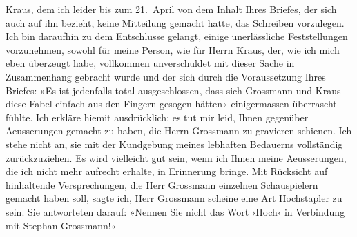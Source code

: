 \begin{ledgroupsized}[t]{13cm}
                  Kraus, dem ich leider bis zum 21. April von dem Inhalt Ihres
               Briefes, der sich auch auf ihn bezieht, keine Mitteilung gemacht hatte, das Schreiben
               vorzulegen. Ich bin daraufhin zu dem Entschlusse gelangt, einige unerlässliche
               Feststellungen vorzunehmen, sowohl für meine Person, wie für Herrn Kraus, der, wie ich mich eben überzeugt habe,
               vollkommen unverschuldet mit dieser Sache in Zusammenhang gebracht wurde und der sich
               durch die Voraussetzung Ihres Briefes: »Es ist jedenfalls total ausgeschlossen, dass
               sich Grossmann und Kraus diese Fabel einfach aus den Fingern gesogen hätten«
               einigermassen überrascht fühlte.\pend
           \pstart
           Ich erkläre hiemit ausdrücklich: es tut mir leid, Ihnen gegenüber Aeusserungen
               gemacht zu haben, die Herrn Grossmann zu
               gravieren schienen. Ich stehe nicht an, sie mit der Kundgebung meines lebhaften
               Bedauerns vollständig zurückzuziehen. Es wird vielleicht gut sein, wenn ich Ihnen
               meine Aeusserungen, die ich nicht mehr aufrecht erhalte, in Erinnerung bringe. Mit
               Rücksicht auf hinhaltende Versprechungen, die Herr Grossmann einzelnen {\pb}Schauspielern gemacht
               haben soll, sagte ich, Herr Grossmann scheine
               eine Art Hochstapler zu sein. Sie antworteten darauf: »Nennen Sie nicht das Wort
               ›Hoch‹ in Verbindung mit Stephan Grossmann!«

\end{ledgroupsized}
